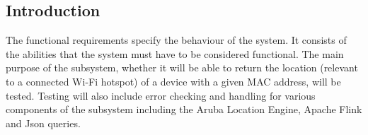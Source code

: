 \subsection{Introduction}
The functional requirements specify the behaviour of the system. It consists of the abilities that the system must have to be considered functional. The main purpose of the subsystem, whether it will be able to return the location (relevant to a connected Wi-Fi hotspot) of a device with a given MAC address, will be tested. Testing will also include error checking and handling for various components of the subsystem including the Aruba Location Engine, Apache Flink and Json queries.  
